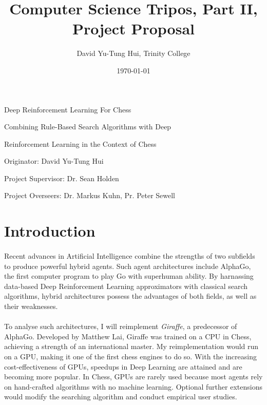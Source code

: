 \documentclass[a4paper]{article}
\title{Computer Science Tripos, Part II, Project Proposal}
\author{David Yu-Tung Hui, Trinity College}
\date{\today}
\begin{document}
\maketitle

\centerline{\huge Deep Reinforcement Learning For Chess}
\vspace{0.2in}
\centerline{\large Combining Rule-Based Search Algorithms with Deep}
\vspace{0.05in}
\centerline{\large Reinforcement Learning in the Context of Chess}
\vspace{0.45in}
\centerline{\large Originator: David Yu-Tung Hui}
\vspace{0.05in}
\centerline{\large Project Supervisor: Dr. Sean Holden}
\vspace{0.05in}
\centerline{\large Project Overseers: Dr. Markus Kuhn, Pr. Peter Sewell}


\section*{Introduction}

\paragraph{}Recent advances in Artificial Intelligence combine the strengths of two subfields to produce powerful hybrid agents. Such agent architectures include AlphaGo, the first computer program to play Go with superhuman ability. \cite{AlphaGo} By harnassing data-based Deep Reinforcement Learning approximators with classical search algorithms, hybrid architectures possess the advantages of both fields, as well as their weaknesses.

\paragraph{}To analyse such architectures, I will reimplement \textit{Giraffe}, a predecessor of AlphaGo. Developed by Matthew Lai, Giraffe was trained on a CPU in Chess, achieving a strength of an international master. \cite{giraffe} My reimplementation would run on a GPU, making it one of the first chess engines to do so. With the increasing cost-effectiveness of GPUs, speedups in Deep Learning are attained and are becoming more popular. In Chess, GPUs are rarely used because most agents rely on hand-crafted algorithms with no machine learning. Optional further extensions would modify the searching algorithm and conduct empirical user studies.
\end{document}
